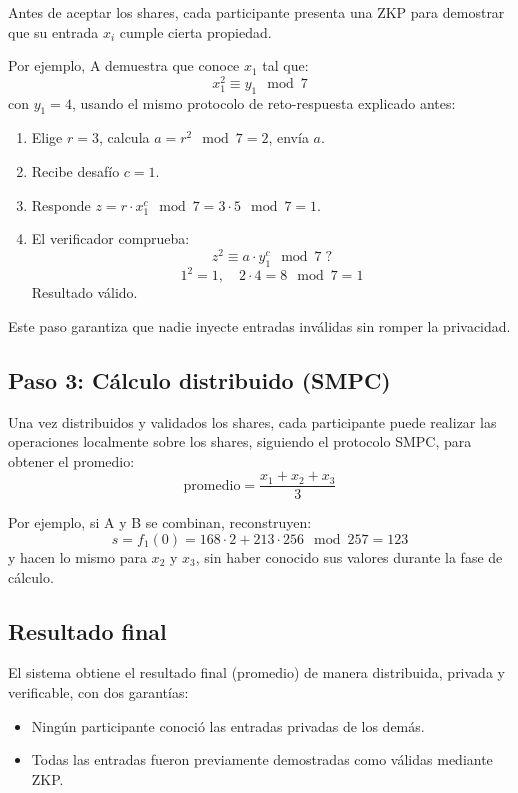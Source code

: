 \documentclass{article}
\begin{document}
Antes de aceptar los shares, cada participante presenta una ZKP para demostrar que su entrada \( x_i \) cumple cierta propiedad.

Por ejemplo, A demuestra que conoce \( x_1 \) tal que:
\[
x_1^2 \equiv y_1 \mod 7
\]
con \( y_1 = 4 \), usando el mismo protocolo de reto-respuesta explicado antes:
\begin{enumerate}
    \item Elige \( r = 3 \), calcula \( a = r^2 \mod 7 = 2 \), envía \( a \).
    \item Recibe desafío \( c = 1 \).
    \item Responde \( z = r \cdot x_1^c \mod 7 = 3 \cdot 5 \mod 7 = 1 \).
    \item El verificador comprueba:
    \[
    z^2 \equiv a \cdot y_1^c \mod 7 \; ?
    \]
    \[
    1^2 = 1, \quad 2 \cdot 4 = 8 \mod 7 = 1
    \]
    Resultado válido.
\end{enumerate}

Este paso garantiza que nadie inyecte entradas inválidas sin romper la privacidad.

\subsection{Paso 3: Cálculo distribuido (SMPC)}

Una vez distribuidos y validados los shares, cada participante puede realizar las operaciones localmente sobre los shares, siguiendo el protocolo SMPC, para obtener el promedio:
\[
\text{promedio} = \frac{x_1 + x_2 + x_3}{3}
\]

Por ejemplo, si A y B se combinan, reconstruyen:
\[
s = f_1(0) = 168 \cdot 2 + 213 \cdot 256 \mod 257 = 123
\]
y hacen lo mismo para \( x_2 \) y \( x_3 \), sin haber conocido sus valores durante la fase de cálculo.

\subsection{Resultado final}

El sistema obtiene el resultado final (promedio) de manera distribuida, privada y verificable, con dos garantías:
\begin{itemize}
    \item Ningún participante conoció las entradas privadas de los demás.
    \item Todas las entradas fueron previamente demostradas como válidas mediante ZKP.
\end{itemize}
\end{document}
